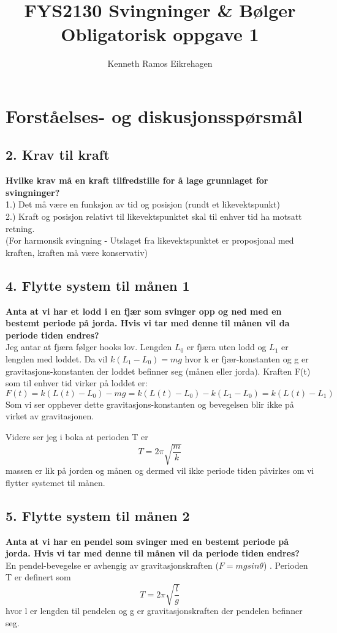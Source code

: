\documentclass[a4paper,12pt,norsk]{article}
\title{FYS2130 Svingninger \& Bølger \\Obligatorisk oppgave 1}
\author{Kenneth Ramos Eikrehagen}
\begin{document}
\maketitle
\tableofcontents
\listoffigures
\newpage

\section{Forståelses- og diskusjonsspørsmål}

\subsection{2. Krav til kraft}
\textbf{Hvilke krav må en kraft tilfredstille for å lage grunnlaget for svingninger?}\\
1.) Det må være en funksjon av tid og posisjon (rundt et likevektspunkt)\\
2.) Kraft og posisjon relativt til likevektspunktet skal til enhver tid ha motsatt retning.\\
(For harmonsik svingning - Utslaget fra likevektspunktet er proposjonal med kraften, kraften må være konservativ)

\subsection{4. Flytte system til månen 1}
\textbf{Anta at vi har et lodd i en fjær som svinger opp og ned med en bestemt periode på jorda. Hvis vi tar med denne til månen vil da periode tiden endres?}\\
Jeg antar at fjæra følger hooks lov. Lengden $L_0$ er fjæra uten lodd og $L_1$ er lengden med loddet. Da vil $k(L_1-L_0) = mg$ hvor k er fjær-konstanten og g er gravitasjons-konstanten der loddet befinner seg (månen eller jorda). Kraften F(t) som til enhver tid virker på loddet er:
$$F(t) = k(L(t)-L_0) -mg = k(L(t)-L_0) - k(L_1-L_0) = k(L(t)-L_1)$$
Som vi ser opphever dette gravitasjons-konstanten og bevegelsen blir ikke på virket av gravitasjonen.

Videre ser jeg i boka at perioden T er $$T = 2\pi \sqrt{\frac{m}{k}}$$ massen er lik på jorden og månen og dermed vil ikke periode tiden påvirkes om vi flytter systemet til månen.

\subsection{5. Flytte system til månen 2}
\textbf{Anta at vi har en pendel som svinger med en bestemt periode på jorda. Hvis vi tar med denne til månen vil da periode tiden endres?}\\
En pendel-bevegelse er avhengig av gravitasjonskraften ($F = mgsin\theta$) . Perioden T er definert som $$T = 2\pi \sqrt{\frac{l}{g}}$$ hvor l er lengden til pendelen og g er gravitasjonskraften der pendelen befinner seg. 
\end{document}

